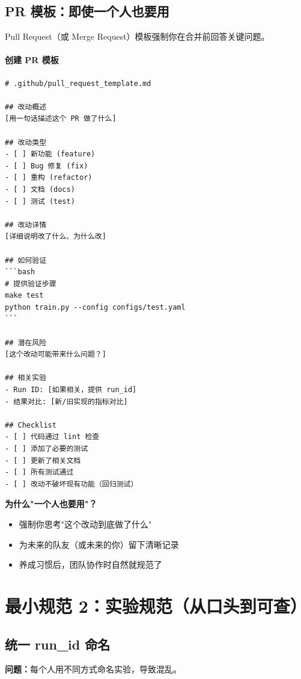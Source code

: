 \subsection{PR 模板：即使一个人也要用}

Pull Request（或 Merge Request）模板强制你在合并前回答关键问题。

\paragraph{创建 PR 模板}

\begin{verbatim}
# .github/pull_request_template.md

## 改动概述
[用一句话描述这个 PR 做了什么]

## 改动类型
- [ ] 新功能 (feature)
- [ ] Bug 修复 (fix)
- [ ] 重构 (refactor)
- [ ] 文档 (docs)
- [ ] 测试 (test)

## 改动详情
[详细说明改了什么、为什么改]

## 如何验证
```bash
# 提供验证步骤
make test
python train.py --config configs/test.yaml
```

## 潜在风险
[这个改动可能带来什么问题？]

## 相关实验
- Run ID: [如果相关，提供 run_id]
- 结果对比: [新/旧实现的指标对比]

## Checklist
- [ ] 代码通过 lint 检查
- [ ] 添加了必要的测试
- [ ] 更新了相关文档
- [ ] 所有测试通过
- [ ] 改动不破坏现有功能（回归测试）
\end{verbatim}

\textbf{为什么"一个人也要用"？}
\begin{itemize}
  \item 强制你思考"这个改动到底做了什么"
  \item 为未来的队友（或未来的你）留下清晰记录
  \item 养成习惯后，团队协作时自然就规范了
\end{itemize}

\section{最小规范 2：实验规范（从口头到可查）}

\subsection{统一 run\_id 命名}

\textbf{问题：}每个人用不同方式命名实验，导致混乱。

